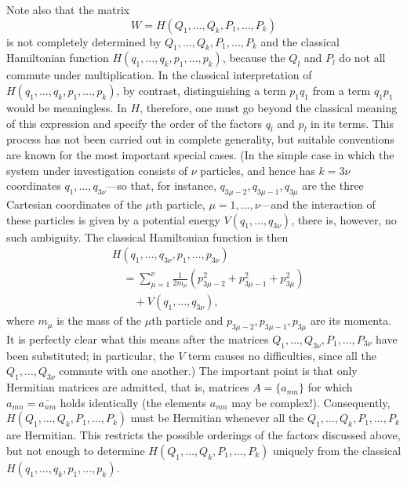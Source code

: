\documentclass[fontsize=13pt,twoside,openany,headings=normal,parskip=false,bookmarkpackage=false,DIV=calc]{scrbook}
\begin{document}
Note also that the matrix
\[
 W=H(Q_1,\ldots,Q_k,P_1,\ldots,P_k)
\]
is not completely determined by $Q_1,\ldots,Q_k,P_1,\ldots,P_k$ and the classical Hamiltonian function $H(q_1,\ldots,q_k,p_1,\ldots,p_k)$, because the $Q_l$ and $P_l$ do not all commute under multiplication. In the classical interpretation of $H(q_1,\ldots,q_k,p_1,\ldots,p_k)$, by contrast, distinguishing a term $p_1q_1$ from a term $q_1p_1$ would be meaningless. In $H$, therefore, one must go beyond the classical meaning of this expression and specify the order of the factors $q_l$ and $p_l$ in its terms. This process has not been carried out in complete generality, but suitable conventions are known for the most important special cases.
\hypertarget{origpage-7}{}%
(In the simple case in which the system under investigation consists of $\nu$ particles, and hence has $k=3\nu$ coordinates $q_1,\ldots,q_{3\nu}$---so that, for instance, $q_{3\mu-2},q_{3\mu-1},q_{3\mu}$ are the three Cartesian coordinates of the $\mu$th particle, $\mu=1,\ldots,\nu$---and the interaction of these particles is given by a potential energy $V(q_1,\ldots,q_{3\nu})$, there is, however, no such ambiguity. The classical Hamiltonian function is then
\begin{align*}
 &H(q_1,\ldots,q_{3\nu},p_1,\ldots,p_{3\nu})\\
 &\quad=\sum_{\mu=1}^{\nu}\frac{1}{2m_\mu}
 (p_{3\mu-2}^2+p_{3\mu-1}^2+p_{3\mu}^2)\\
 &\qquad+V(q_1,\ldots,q_{3\nu}),
\end{align*}
where $m_\mu$ is the mass of the $\mu$th particle and $p_{3\mu-2},p_{3\mu-1},p_{3\mu}$ are its momenta. It is perfectly clear what this means after the matrices $Q_1,\ldots,Q_{3\nu},P_1,\ldots,P_{3\nu}$ have been substituted; in particular, the $V$ term causes no difficulties, since all the $Q_1,\ldots,Q_{3\nu}$ commute with one another.) The important point is that only Hermitian matrices are admitted, that is, matrices $A=\{a_{mn}\}$ for which $a_{mn}=\overline{a_{nm}}$ holds identically (the elements $a_{mn}$ may be complex!). Consequently, $H(Q_1,\ldots,Q_k,P_1,\ldots,P_k)$ must be Hermitian whenever all the $Q_1,\ldots,Q_k,P_1,\ldots,P_k$ are Hermitian. This restricts the possible orderings of the factors discussed above, but not enough to determine $H(Q_1,\ldots,Q_k,P_1,\ldots,P_k)$ uniquely from the classical $H(q_1,\ldots,q_k,p_1,\ldots,p_k)$.
\end{document}
